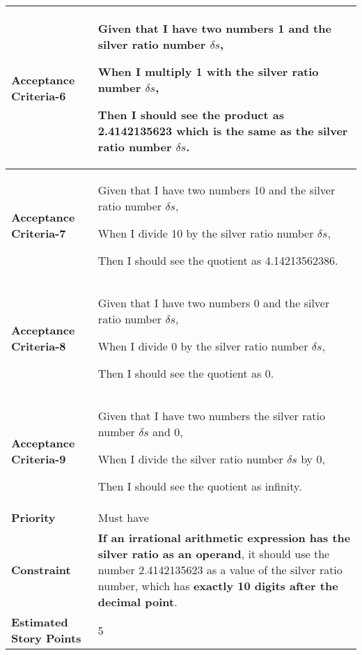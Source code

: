 \begin{center}
\begin{tabular}{ | m{2.3cm} | m{12cm} | }
\hline
\textbf{Acceptance Criteria-6} & Given that I have two numbers 1 and the silver ratio number $\delta s$,

When I multiply 1 with the silver ratio number $\delta s$,

Then I should see the product as 2.4142135623 which is the same as the silver ratio number $\delta s$. \\

\hline
\textbf{Acceptance Criteria-7} & Given that I have two numbers 10 and the silver ratio number $\delta s$,

When I divide 10 by the silver ratio number $\delta s$,

Then I should see the quotient as 4.14213562386. \\

\hline
\textbf{Acceptance Criteria-8} & Given that I have two numbers 0 and the silver ratio number $\delta s$,

When I divide 0 by the silver ratio number $\delta s$,

Then I should see the quotient as 0. \\

\hline
\textbf{Acceptance Criteria-9} & Given that I have two numbers the silver ratio number $\delta s$ and 0,

When I divide the silver ratio number $\delta s$ by 0,

Then I should see the quotient as infinity.\\

\hline
\textbf{Priority} & Must have \\ 

\hline
\textbf{Constraint} & \textbf{If an irrational arithmetic expression has the silver ratio as an operand}, it should use the number 2.4142135623 as a value of the silver ratio number, which has \textbf{exactly 10 digits after the decimal point}.\\

\hline
\textbf{Estimated Story Points} & 5 \\ 
\hline

\end{tabular}
\end{center}

